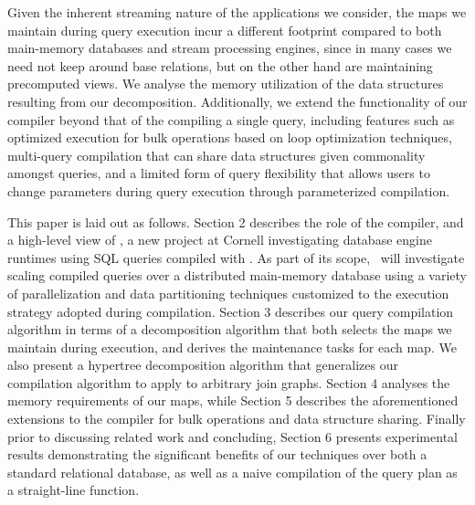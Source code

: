 Given the inherent streaming nature of the applications we consider, the maps we
maintain during query execution incur a different footprint compared to both
main-memory databases and stream processing engines, since in many cases we need
not keep around base relations, but on the other hand are maintaining precomputed
views. We analyse the memory utilization of the data structures resulting from
our decomposition. Additionally, we extend the functionality of our compiler
beyond that of the compiling a single query, including features such as optimized
execution for bulk operations based on loop optimization techniques, multi-query
compilation that can share data structures given commonality amongst queries, and
a limited form of query flexibility that allows users to change parameters during
query execution through parameterized compilation.

This paper is laid out as follows. Section 2 describes the role of the compiler,
and a high-level view of \project, a new project at Cornell investigating
database engine runtimes using SQL queries compiled with \compiler. As part of
its scope, \project\ will investigate scaling compiled queries over a distributed
main-memory database using a variety of parallelization and data partitioning
techniques customized to the execution strategy adopted during compilation.
Section 3 describes our query compilation algorithm in terms of a decomposition
algorithm that both selects the maps we maintain during execution, and derives
the maintenance tasks for each map. We also present a hypertree decomposition
algorithm that generalizes our compilation algorithm to apply to arbitrary join
graphs. Section 4 analyses the memory requirements of our maps, while Section 5
describes the aforementioned extensions to the compiler for bulk operations and
data structure sharing. Finally prior to discussing related work and concluding,
Section 6 presents experimental results demonstrating the significant benefits of
our techniques over both a standard relational database, as well as a naive
compilation of the query plan as a straight-line function.


